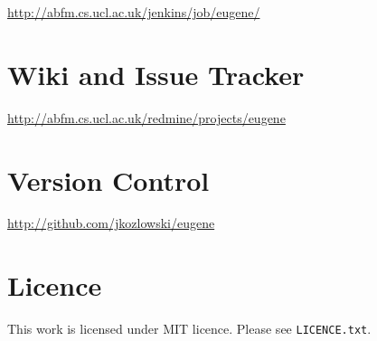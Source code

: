 \url{http://abfm.cs.ucl.ac.uk/jenkins/job/eugene/}

\section{Wiki and Issue Tracker}

\url{http://abfm.cs.ucl.ac.uk/redmine/projects/eugene}

\section{Version Control}

\url{http://github.com/jkozlowski/eugene}

\section{Licence}
This work is licensed under MIT licence. Please see \texttt{LICENCE.txt}.
